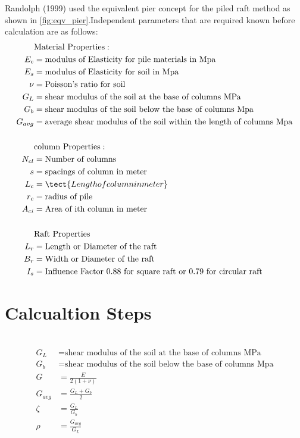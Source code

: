 \documentclass[12pt]{article}
\begin{document}
Randolph (1999) used the equivalent pier concept for the piled raft method as shown in \ref{fig:eqv_pier}.Independent parameters that are required known before calculation are as follows:
\begin{equation*}
\begin{align*}
&\text{Material Properties}:\\
E_c&=\text{modulus of Elasticity for pile materials in Mpa}\\
E_s&=\text{modulus of Elasticity for soil in Mpa}\\
\nu &=\text{Poisson's ratio for soil}\\
G_L&=\text{shear modulus of the soil at the base of columns MPa}\\
G_b&=\text{shear modulus of the soil below the base of columns Mpa}\\
G_{avg}&=\text{average shear modulus of the soil within the length of columns Mpa}\\\\
&\text{column Properties}:\\
N_{cl}&=\text{Number of columns}\\
s&=\text{spacings of column in meter}\\
L_c&=\tect{Length of column in meter}\\
r_c&=\text{radius of pile}\\
A_{ci}&=\text{Area of ith column in meter}\\\\
&\text{Raft Properties}\\
L_r&=\text{Length or Diameter of the raft}\\
B_r&=\text{Width or Diameter of the raft}\\
I_s&=\text{Influence Factor 0.88 for square raft or 0.79 for circular raft}\\
\end{align*}
\end{equation*}

\section{Calcualtion Steps}
\noindent {}\\
\begin{equation*}
\begin{align*}
G_L&=\text{shear modulus of the soil at the base of columns MPa}\\
G_b&=\text{shear modulus of the soil below the base of columns Mpa}\\
G&=\frac{E}{2(1+\nu)}\\
G_{avg}&=\frac{G_L+G_b}{2}\\
\zeta&=\frac{G_L}{G_b}\\
\rho&=\frac{G_{avg}}{G_L}
\end{align*}
\end{equation*}
\end{document}
